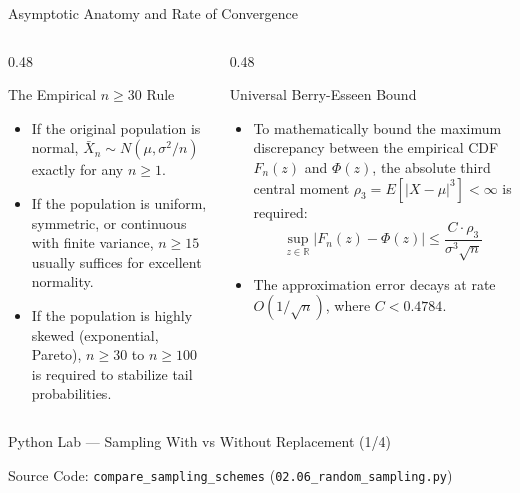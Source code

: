 \documentclass[10pt, aspectratio=169]{beamer}
\begin{document}
\begin{frame}{Asymptotic Anatomy and Rate of Convergence}
  \begin{columns}[T]
    \begin{column}{0.48\textwidth}
      \begin{block}{The Empirical $n \ge 30$ Rule}
        \small
        \begin{itemize}\itemsep=0.1cm
          \item If the original population is normal, $\bar{X}_n \sim N(\mu, \sigma^2/n)$ exactly for any $n \ge 1$.
          \item If the population is uniform, symmetric, or continuous with finite variance, $n \ge 15$ usually suffices for excellent normality.
          \item If the population is highly skewed (exponential, Pareto), $n \ge 30$ to $n \ge 100$ is required to stabilize tail probabilities.
        \end{itemize}
      \end{block}
    \end{column}
    \begin{column}{0.48\textwidth}
      \begin{alertblock}{Universal Berry-Esseen Bound}
        \small
        \begin{itemize}\itemsep=0.1cm
          \item To mathematically bound the maximum discrepancy between the empirical CDF $F_n(z)$ and $\Phi(z)$, the absolute third central moment $\rho_3 = E[|X - \mu|^3] < \infty$ is required:
          $$\sup_{z \in \mathbb{R}} |F_n(z) - \Phi(z)| \le \frac{C \cdot \rho_3}{\sigma^3 \sqrt{n}}$$
          \item The approximation error decays at rate $O(1/\sqrt{n})$, where $C < 0.4784$.
        \end{itemize}
      \end{alertblock}
    \end{column}
  \end{columns}
\end{frame}

\begin{frame}[fragile]{Python Lab --- Sampling With vs Without Replacement (1/4)}
  \vspace{-0.1cm}
  \begin{block}{Source Code: \texttt{compare\_sampling\_schemes} (\texttt{02.06\_random\_sampling.py})}
    
  \end{block}
\end{frame}
\end{document}
